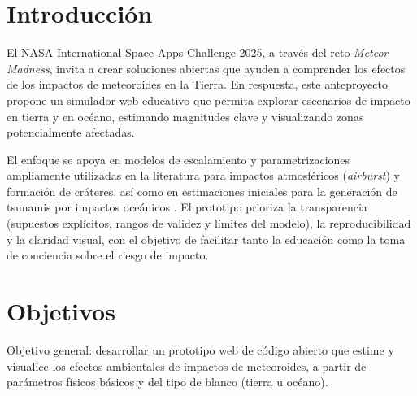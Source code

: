 \documentclass[conference]{IEEEtran}
\begin{document}




%
\IEEEpeerreviewmaketitle




\section{Introducción}

El NASA International Space Apps Challenge 2025, a través del reto \textit{Meteor Madness}, invita a crear soluciones abiertas que ayuden a comprender los efectos de los impactos de meteoroides en la Tierra. En respuesta, este anteproyecto propone un simulador web educativo que permita explorar escenarios de impacto en tierra y en océano, estimando magnitudes clave y visualizando zonas potencialmente afectadas.

El enfoque se apoya en modelos de escalamiento y parametrizaciones ampliamente utilizadas en la literatura para impactos atmosféricos (\textit{airburst}) y formación de cráteres, así como en estimaciones iniciales para la generación de tsunamis por impactos oceánicos \cite{collins2005,holsapple1993,wuennemann2010}. El prototipo prioriza la transparencia (supuestos explícitos, rangos de validez y límites del modelo), la reproducibilidad y la claridad visual, con el objetivo de facilitar tanto la educación como la toma de conciencia sobre el riesgo de impacto.

\section{Objetivos}

Objetivo general: desarrollar un prototipo web de código abierto que estime y visualice los efectos ambientales de impactos de meteoroides, a partir de parámetros físicos básicos y del tipo de blanco (tierra u océano).
\end{document}
